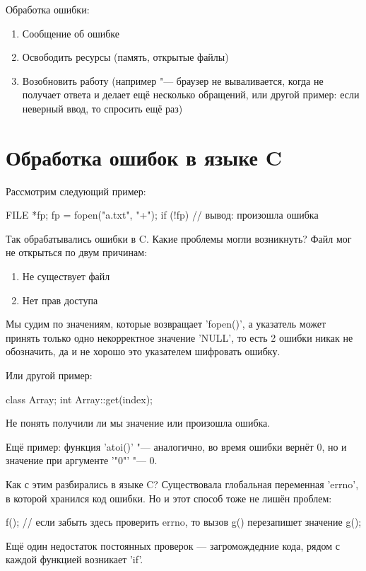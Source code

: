 Обработка ошибки:
\begin{enumerate}
\item
	Сообщение об ошибке

\item
	Освободить ресурсы (память, открытые файлы)

\item
	Возобновить работу (например "--- браузер не вываливается, когда не получает ответа и делает ещё несколько обращений,
	или другой пример: если неверный ввод, то спросить ещё раз)
\end{enumerate}

\section{Обработка ошибок в языке C}

Рассмотрим следующий пример:
\begin{cppcode}
FILE *fp;
fp = fopen("a.txt", "+");
if (!fp) {
	// вывод: произошла ошибка
}
\end{cppcode}
Так обрабатывались ошибки в C.
Какие проблемы могли возникнуть?
Файл мог не открыться по двум причинам:
\begin{enumerate}
	\item Не существует файл
	\item Нет прав доступа
\end{enumerate}

Мы судим по значениям, которые возвращает \cpp'fopen()', а указатель может принять только одно некорректное значение \cpp'NULL',
то есть 2 ошибки никак не обозначить, да и не хорошо это указателем шифровать ошибку.

Или другой пример:
\begin{cppcode}
class Array;
int Array::get(index);
\end{cppcode}
Не понять получили ли мы значение или произошла ошибка.

Ещё пример: функция \cpp'atoi()' "--- аналогично, во время ошибки вернёт 0, но и значение при аргументе \cpp'"0"' "--- 0.

Как с этим разбирались в языке C? Существовала глобальная переменная \cpp'errno', в которой хранился код ошибки.
Но и этот способ тоже не лишён проблем:
\begin{cppcode}
f();
// если забыть здесь проверить errno, то вызов g() перезапишет значение
g();
\end{cppcode}
Ещё один недостаток постоянных проверок --- загромождедние кода, рядом с каждой функцией возникает \cpp'if'.

